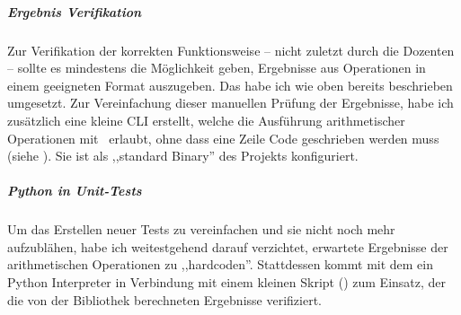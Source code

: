 \subparagraph*{Ergebnis Verifikation}
Zur Verifikation der korrekten Funktionsweise -- nicht zuletzt durch die Dozenten -- sollte es mindestens die Möglichkeit geben, Ergebnisse aus Operationen in einem geeigneten Format auszugeben.
Das habe ich wie oben bereits beschrieben umgesetzt. Zur Vereinfachung dieser manuellen Prüfung der Ergebnisse, habe ich zusätzlich eine kleine CLI erstellt, welche die Ausführung arithmetischer Operationen mit \mpi\ erlaubt, ohne dass eine Zeile Code geschrieben werden muss (siehe ). Sie ist als ,,standard Binary'' des Projekts konfiguriert.

\subparagraph*{Python in Unit-Tests}
Um das Erstellen neuer Tests zu vereinfachen und sie nicht noch mehr aufzublähen, habe ich weitestgehend darauf verzichtet, erwartete Ergebnisse der arithmetischen Operationen zu ,,hardcoden''. Stattdessen kommt mit dem   ein Python Interpreter in Verbindung mit einem kleinen Skript () zum Einsatz, der die von der Bibliothek berechneten Ergebnisse verifiziert.
